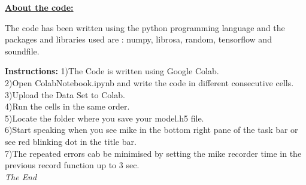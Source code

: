 \documentclass[a4paper,12pt]{article}
\begin{document}
	\textbf{\underline{About the code:}}
	
	The code has been written using the python programming language and the packages and libraries used are : numpy, librosa, random, tensorflow and soundfile. 
	
	
	\newpage

\textbf{Instructions:}	
1)The Code is written using Google Colab.\\

2)Open ColabNotebook.ipynb and write the code in different consecutive cells.\\

3)Upload the Data Set to Colab.\\

4)Run the cells in the same order.\\

5)Locate the folder where you save your model.h5 file.\\

6)Start speaking when you see mike in the bottom right pane of the task bar or see red blinking dot in the title bar.\\

7)The repeated errors cab be minimised by setting the mike recorder time in the previous record function up to 3 sec.\\
	
	
	
	
	\vfill\emph{The End}
	
\end{document}
